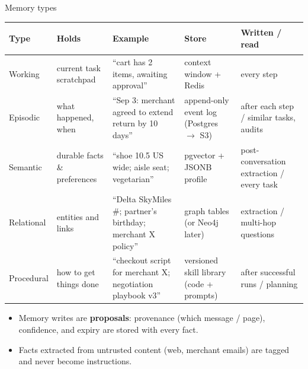 \documentclass[aspectratio=169,10pt]{beamer}
\begin{document}
\begin{frame}{Memory types}
\scriptsize
\renewcommand{\arraystretch}{1.35}
\begin{tabularx}{\linewidth}{>{\bfseries\raggedright\arraybackslash}p{1.7cm} X X p{3.0cm} X}
\toprule
Type & Holds & Example & Store & Written / read\\
\midrule
Working & current task scratchpad & ``cart has 2 items, awaiting approval'' & context window + Redis & every step\\
Episodic & what happened, when & ``Sep 3: merchant agreed to extend return by 10 days'' & append-only event log (Postgres $\rightarrow$ S3) & after each step / similar tasks, audits\\
Semantic & durable facts \& preferences & ``shoe 10.5 US wide; aisle seat; vegetarian'' & pgvector + JSONB profile & post-conversation extraction / every task\\
Relational & entities and links & ``Delta SkyMiles \#; partner's birthday; merchant X policy'' & graph tables (or Neo4j later) & extraction / multi-hop questions\\
Procedural & how to get things done & ``checkout script for merchant X; negotiation playbook v3'' & versioned skill library (code + prompts) & after successful runs / planning\\
\bottomrule
\end{tabularx}
\vspace{6pt}
\begin{itemize}
  \item Memory writes are \textbf{proposals}: provenance (which message / page), confidence, and expiry are stored with every fact.
  \item Facts extracted from untrusted content (web, merchant emails) are tagged and never become instructions.
\end{itemize}
\end{frame}
\end{document}
